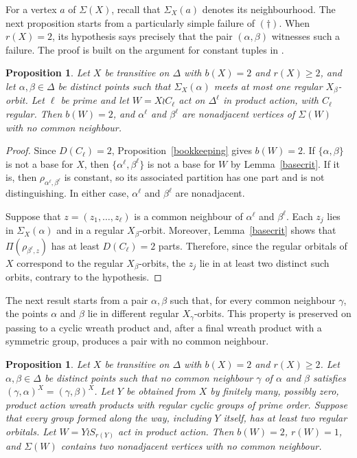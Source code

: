 \documentclass[a4paper,reqno,11pt]{amsart}
\newtheorem{prop}[thm]{Proposition}
\numberwithin{equation}{section}
\begin{document}
For a vertex $a$ of $\Sigma(X)$, recall that $\Sigma_X(a)$ denotes its neighbourhood. The next proposition starts from a particularly simple failure of $(\dagger)$. When $r(X)=2$, its hypothesis says precisely that the pair $(\alpha,\beta)$ witnesses such a failure. The proof is built on the argument for constant tuples in \cite[Lemma~5.6]{BH}.

\begin{prop}\label{cprop}
Let $X$ be transitive on $\Delta$ with $b(X)=2$ and $r(X)\ge 2$, and let $\alpha,\beta\in\Delta$ be distinct points such that $\Sigma_X(\alpha)$ meets at most one regular $X_\beta$-orbit. Let $\ell$ be prime and let $W=X\wr C_\ell$ act on $\Delta^\ell$ in product action, with $C_\ell$ regular. Then $b(W)=2$, and $\alpha^\ell$ and $\beta^\ell$ are nonadjacent vertices of $\Sigma(W)$ with no common neighbour.
\end{prop}

\begin{proof}
Since $D(C_\ell)=2$, Proposition~\ref{bookkeeping} gives $b(W)=2$. If $\{\alpha,\beta\}$ is not a base for $X$, then $\{\alpha^\ell,\beta^\ell\}$ is not a base for $W$ by Lemma~\ref{basecrit}. If it is, then $\rho_{\alpha^\ell,\beta^\ell}$ is constant, so its associated partition has one part and is not distinguishing. In either case, $\alpha^\ell$ and $\beta^\ell$ are nonadjacent.

Suppose that $z=(z_1,\dots,z_\ell)$ is a common neighbour of $\alpha^\ell$ and $\beta^\ell$. Each $z_j$ lies in $\Sigma_X(\alpha)$ and in a regular $X_\beta$-orbit. Moreover, Lemma~\ref{basecrit} shows that $\Pi(\rho_{\beta^\ell,z})$ has at least $D(C_\ell)=2$ parts. Therefore, since the regular orbitals of $X$ correspond to the regular $X_\beta$-orbits, the $z_j$ lie in at least two distinct such orbits, contrary to the hypothesis.
\end{proof}

The next result starts from a pair $\alpha,\beta$ such that, for every common neighbour $\gamma$, the points $\alpha$ and $\beta$ lie in different regular $X_\gamma$-orbits. This property is preserved on passing to a cyclic wreath product and, after a final wreath product with a symmetric group, produces a pair with no common neighbour.


\begin{prop}\label{sprop}
Let $X$ be transitive on $\Delta$ with $b(X)=2$ and $r(X)\ge2$. Let $\alpha,\beta\in\Delta$ be distinct points such that no common neighbour $\gamma$ of $\alpha$ and $\beta$ satisfies $(\gamma,\alpha)^X=(\gamma,\beta)^X$. Let $Y$ be obtained from $X$ by finitely many, possibly zero, product action wreath products with regular cyclic groups of prime order. Suppose that every group formed along the way, including $Y$ itself, has at least two regular orbitals. Let $W=Y\wr S_{r(Y)}$ act in product action. Then $b(W)=2$, $r(W)=1$, and $\Sigma(W)$ contains two nonadjacent vertices with no common neighbour.
\end{prop}
\end{document}

